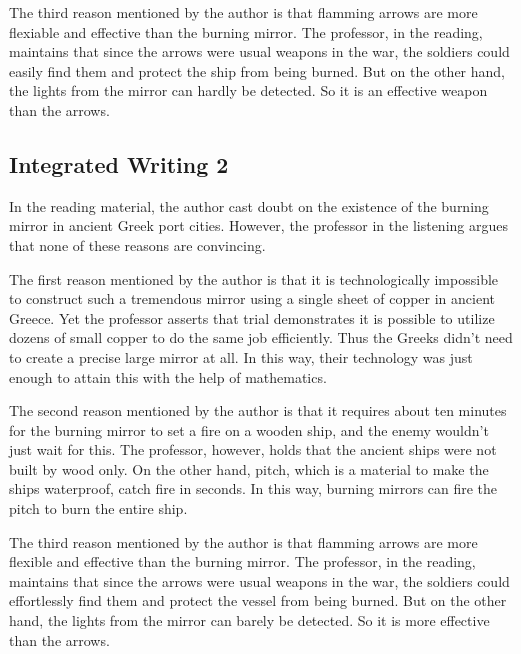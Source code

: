 The third reason mentioned by the author is that flamming arrows are more flexiable and effective than the burning mirror. The professor, in the reading, maintains that since the arrows were usual weapons in the war, the soldiers could easily find them and protect the ship from being burned. But on the other hand, the lights from the mirror can hardly be detected. So it is an effective weapon than the arrows.

\subsection{Integrated Writing 2}

In the reading material, the author cast doubt on the existence of the burning mirror in ancient Greek port cities. However, the professor in the listening argues that none of these reasons are convincing.

The first reason mentioned by the author is that it is technologically impossible to construct such a tremendous mirror using a single sheet of copper in ancient Greece. Yet the professor asserts that trial demonstrates it is possible to utilize dozens of small copper to do the same job efficiently. Thus the Greeks didn't need to create a precise large mirror at all. In this way, their technology was just enough to attain this with the help of mathematics.

The second reason mentioned by the author is that it requires about ten minutes for the burning mirror to set a fire on a wooden ship, and the enemy wouldn't just wait for this. The professor, however, holds that the ancient ships were not built by wood only. On the other hand, pitch, which is a material to make the ships waterproof, catch fire in seconds. In this way, burning mirrors can fire the pitch to burn the entire ship.

The third reason mentioned by the author is that flamming arrows are more flexible and effective than the burning mirror. The professor, in the reading, maintains that since the arrows were usual weapons in the war, the soldiers could effortlessly find them and protect the vessel from being burned. But on the other hand, the lights from the mirror can barely be detected. So it is more effective than the arrows.